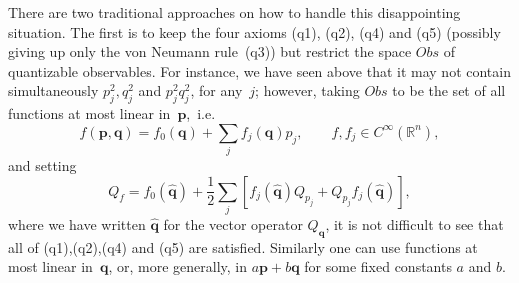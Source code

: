 \documentclass[11pt]{amsart}
\numberwithin{equation}{section}
\theoremstyle{remark}
\newcommand\Obs{Obs}
\newcommand\RR{\mathbb R}
\newcommand{\bp}{\mathbf p}
\newcommand{\bq}{\mathbf q}
\begin{document}
There are two traditional approaches on how to handle this disappointing
situation. The first is to keep the four axioms (q1), (q2), (q4) and (q5)
(possibly giving up only the von Neumann rule~(q3)) but restrict the space
$\Obs$ of quantizable observables. For instance, we have seen above that it may
not contain simultaneously $p_j^2,q_j^2$ and $p_j^2 q_j^2$, for any~$j$;
however, taking $\Obs$ to be the set of all functions at most linear
in~$\bp$,~i.e.
$$ f(\bp,\bq) = f_0(\bq) + \sum_j f_j(\bq) p_j, \qquad
 f,f_j\in C^\infty(\RR^n), $$
and setting
$$ Q_f = f_0(\widehat{\bq} ) + \frac12 \sum_j [ f_j(\widehat{\bq}) Q_{p_j} +
 Q_{p_j} f_j(\widehat{\bq}) ],  $$
where we have written $\widehat{\bq}$ for the vector operator $Q_\bq$,
it is not difficult to see that all of (q1),(q2),(q4) and (q5) are satisfied.
Similarly one can use functions at most linear in~$\bq$, or, more generally, in
$a\bp+b\bq$ for some fixed constants $a$ and $b$.
\end{document}
